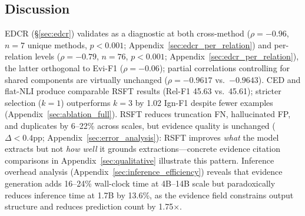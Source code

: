 \subsection{Discussion}
\label{sec:analysis}

EDCR (\S\ref{sec:edcr}) validates as a diagnostic at both cross-method ($\rho = -0.96$, $n = 7$ unique methods, $p < 0.001$; Appendix~\ref{sec:edcr_per_relation}) and per-relation levels ($\rho = -0.79$, $n = 76$, $p < 0.001$; Appendix~\ref{sec:edcr_per_relation}), the latter orthogonal to Evi-F1 ($\rho = -0.06$); partial correlations controlling for shared components are virtually unchanged ($\rho = -0.9617$ vs.\ $-0.9643$). CED and flat-NLI produce comparable RSFT results (Rel-F1 45.63 vs.\ 45.61); stricter selection ($k{=}1$) outperforms $k{=}3$ by 1.02 Ign-F1 despite fewer examples (Appendix~\ref{sec:ablation_full}). RSFT reduces truncation FN, hallucinated FP, and duplicates by 6--22\% across scales, but evidence quality is unchanged ($\Delta < 0.4$pp; Appendix~\ref{sec:error_analysis}): RSFT improves \emph{what} the model extracts but not \emph{how well} it grounds extractions---concrete evidence citation comparisons in Appendix~\ref{sec:qualitative} illustrate this pattern. Inference overhead analysis (Appendix~\ref{sec:inference_efficiency}) reveals that evidence generation adds 16--24\% wall-clock time at 4B--14B scale but paradoxically reduces inference time at 1.7B by 13.6\%, as the evidence field constrains output structure and reduces prediction count by 1.75$\times$.

